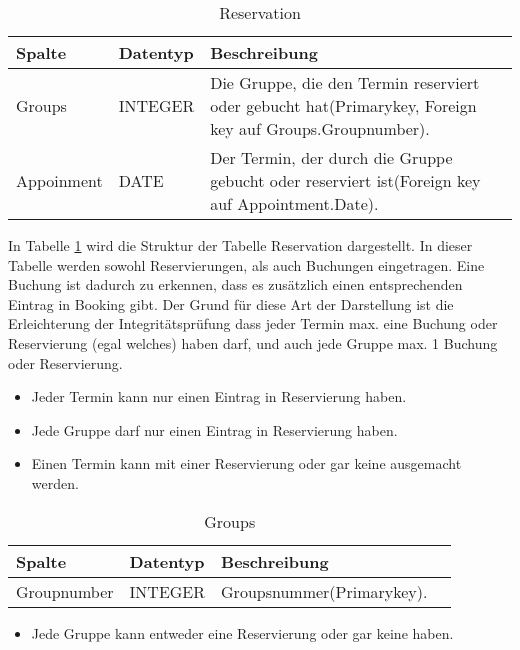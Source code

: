 \documentclass[10pt,a4paper]{article}
\begin{document}
\begin{table}[h]
\centering
	\caption{Reservation}
	\label{tab:Reservation}
    \begin{tabular}{| l | l | l |}
    \hline
    \rowcolor{lightgray} Spalte & Datentyp & Beschreibung  \\ \hline
    Groups & INTEGER & Die Gruppe, die den Termin reserviert oder gebucht hat(Primarykey, Foreign key auf Groups.Groupnumber).  \\ \hline
    Appoinment & DATE & Der Termin, der durch die Gruppe gebucht oder reserviert ist(Foreign key auf Appointment.Date). \\ \hline
    \end{tabular}
\end{table}
In Tabelle \ref{tab:Reservation} wird die Struktur der Tabelle Reservation  dargestellt.  In dieser Tabelle werden sowohl Reservierungen, als auch Buchungen eingetragen. Eine Buchung ist dadurch zu erkennen, dass es zusätzlich einen entsprechenden Eintrag in Booking gibt. Der Grund für diese Art der Darstellung ist die Erleichterung der Integritätsprüfung dass jeder Termin max. eine Buchung oder Reservierung (egal welches) haben darf, und auch jede Gruppe max. 1 Buchung oder Reservierung.

\begin{itemize} 
\item Jeder Termin kann nur einen Eintrag in Reservierung haben.
\item Jede Gruppe darf nur einen Eintrag in Reservierung haben.
\item Einen Termin kann mit einer Reservierung oder gar keine ausgemacht werden.
\end{itemize}
\begin{table}[h]
\centering
\caption{Groups}
    \label{tab:Groups}    
    \begin{tabular}{| l | l | l | l |}
    \hline
    \rowcolor{lightgray} Spalte & Datentyp & Beschreibung  \\ \hline
    Groupnumber & INTEGER & Groupsnummer(Primarykey).  \\ \hline
   \end{tabular}
\end{table}

\begin{itemize}
\item Jede Gruppe kann entweder eine Reservierung oder gar keine haben. 

\end{itemize}
\end{document}
